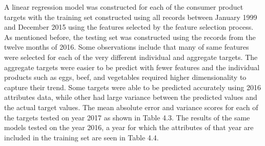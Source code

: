\documentclass[12pt]{dalthesis}
\begin{document}
A linear regression model was constructed for each of the consumer product targets with the training set constructed using all records between January 1999 and December 2015 using the features selected by the feature selection process. As mentioned before, the testing set was constructed using the records from the twelve months of 2016. Some observations include that many of same features were selected for each of the very different individual and aggregate targets. The aggregate targets were easier to be predict with fewer features and the individual products such as eggs, beef, and vegetables required higher dimensionality to capture their trend. Some targets were able to be predicted accurately using 2016 attributes data, while other had large variance between the predicted values and the actual target values. The mean absolute error and variance scores for each of the targets tested on year 2017 as shown in Table 4.3. The results of the same models tested on the year 2016, a year for which the attributes of that year are included in the training set are seen in Table 4.4. \\
\end{document}
